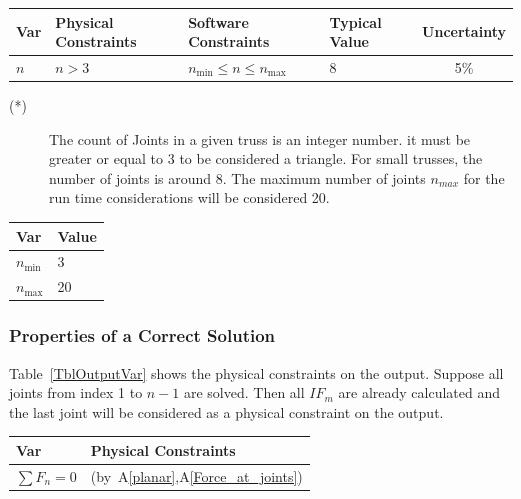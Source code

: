 \documentclass[12pt]{article}
\newcommand{\aref}[1]{A\ref{#1}}
\begin{document}
\begin{table}[!h]
  \caption{Input Variables} \label{TblInputVar}
  \renewcommand{\arraystretch}{1.2}
\noindent \begin{longtable*}{l l l l c} 
  \toprule
  \textbf{Var} & \textbf{Physical Constraints} & \textbf{Software Constraints} &
                             \textbf{Typical Value} & \textbf{Uncertainty}\\
  \midrule 
  $n$ & $n > 3$ & $n_{\text{min}} \leq n \leq n_{\text{max}}$ & 8  & 5\%
  \\
  \bottomrule
\end{longtable*}
\end{table}

\noindent 
\begin{description}

\item[(*)] The count of Joints in a given truss is an integer number. it must be greater or equal to 3 to be considered a triangle. For small trusses, the number of joints is around 8. The maximum number of joints $n_{max}$ for the run time considerations will be considered 20.
\end{description}

\begin{table}[!h]
\caption{Specification Parameter Values} \label{TblSpecParams}
\renewcommand{\arraystretch}{1.2}
\noindent \begin{longtable*}{l l} 
  \toprule
  \textbf{Var} & \textbf{Value} \\
  \midrule 
  $n_\text{min}$ & 3 \\
  $n_\text{max}$ & 20\\
  \bottomrule
\end{longtable*}
\end{table}

\subsubsection{Properties of a Correct Solution} \label{sec_CorrectSolution}

\noindent
Table~\ref{TblOutputVar} shows the physical constraints on the output. Suppose all joints from index 1 to $n-1$ are solved. Then all $IF_{m}$ are already calculated and the last joint will be considered as a physical constraint on the output.

\begin{table}[!h]
\caption{Output Variables} \label{TblOutputVar}
\renewcommand{\arraystretch}{1.2}
\noindent \begin{longtable*}{l l} 
  \toprule
  \textbf{Var} & \textbf{Physical Constraints} \\
  \midrule 
  $\sum F_{n}=0$ &  (by~\aref{planar},\aref{Force_at_joints})
  \\
  \bottomrule
\end{longtable*}
\end{table}
\end{document}

